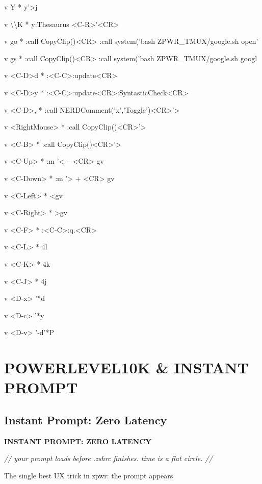 \documentclass[11pt,a4paper,twoside]{book}
\begin{document}
v  Y  * y'>j

v  \textbackslash{}\textbackslash{}K  * y:Thesaurus <C-R>'<CR>

v  go  * :call CopyClip()<CR> :call system('bash ZPWR\_TMUX/google.sh open'

v  gs  * :call CopyClip()<CR> :call system('bash ZPWR\_TMUX/google.sh googl

v  <C-D>d  * :<C-C>:update<CR>

v  <C-D>y  * :<C-C>:update<CR>:SyntasticCheck<CR>

v  <C-D>,  * :call NERDComment('x','Toggle')<CR>'>

v  <RightMouse> * :call CopyClip()<CR>'>

v  <C-B>  * :call CopyClip()<CR>'>

v  <C-Up>  * :m '< -- <CR> gv

v  <C-Down>  * :m '> + <CR> gv

v  <C-Left>  * <gv

v  <C-Right>  * >gv

v  <C-F>  * :<C-C>:q.<CR>

v  <C-L>  * 4l

v  <C-K>  * 4k

v  <C-J>  * 4j

v  <D-x>  '*d

v  <D-c>  '*y

v  <D-v>  '-d'*P


\vspace{16pt}


\chapter{POWERLEVEL10K \& INSTANT PROMPT}

\section{Instant Prompt: Zero Latency}


\vspace{10pt}
{\large\bfseries\color{neoncyan} INSTANT PROMPT: ZERO LATENCY}\vspace{6pt}

{\small\itshape\color{dimtext} // your prompt loads before .zshrc finishes. time is a flat circle. //}

\begin{codebox}
The single best UX trick in zpwr: the prompt appears\\
\end{codebox}
\end{document}
